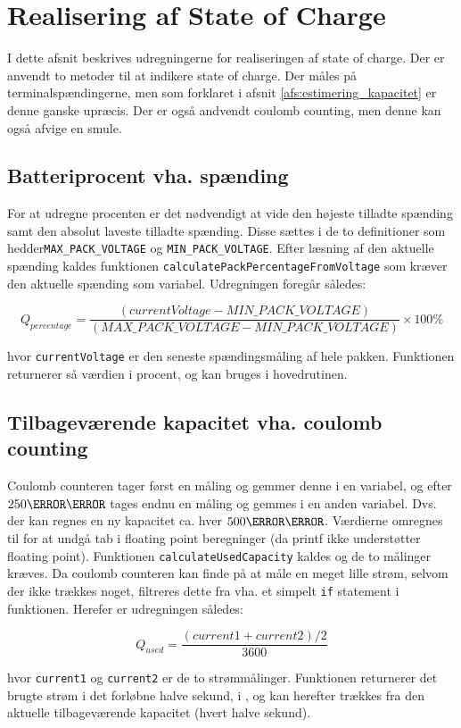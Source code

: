 \section{Realisering af State of Charge}\label{afs:SOC_realization}
I dette afsnit beskrives udregningerne for realiseringen af state of charge. Der er anvendt to metoder til at indikere state of charge. Der måles på terminalspændingerne, men som forklaret i afsnit \ref{afs:estimering_kapacitet} er denne ganske upræcis. Der er også andvendt coulomb counting, men denne kan også afvige en smule.

\subsection{Batteriprocent vha. spænding}
For at udregne procenten er det nødvendigt at vide den højeste tilladte spænding samt den absolut laveste tilladte spænding. Disse sættes i de to definitioner som hedder\newline \verb|MAX_PACK_VOLTAGE| og \verb|MIN_PACK_VOLTAGE|. Efter læsning af den aktuelle spænding kaldes funktionen \verb|calculatePackPercentageFromVoltage| som kræver den aktuelle spænding som variabel. Udregningen foregår således:

\begin {equation}
Q_{percentage} =  \frac{(\mathit{currentVoltage} - \mathit{MIN\_PACK\_VOLTAGE})}{(\mathit{MAX\_PACK\_VOLTAGE} - \mathit{MIN\_PACK\_VOLTAGE})} \times 100\percent
\label{eq:q_percentage}
\end {equation}

hvor \verb|currentVoltage| er den seneste spændingsmåling af hele pakken. Funktionen returnerer så værdien i procent, og kan bruges i hovedrutinen.

\subsection{Tilbageværende kapacitet vha. coulomb counting}
Coulomb counteren tager først en måling og gemmer denne i en variabel, og efter $250\milli\second$ tages endnu en måling og gemmes i en anden variabel. Dvs. der kan regnes en ny kapacitet ca. hver $500\milli\second$. Værdierne omregnes til \micro\ampere\space for at undgå tab i floating point beregninger (da printf ikke understøtter floating point). Funktionen \verb|calculateUsedCapacity| kaldes og de to målinger kræves. Da coulomb counteren kan finde på at måle en meget lille strøm, selvom der ikke trækkes noget, filtreres dette fra vha. et simpelt \verb|if| statement i funktionen. Herefer er udregningen således: 

\begin {equation}
Q_{used} =  \frac{(\mathit{current1} + \mathit{current2}) / 2}{3600}
\label{eq:q_used}
\end {equation}

hvor \verb|current1| og \verb|current2| er de to strømmålinger. Funktionen returnerer det brugte strøm i det forløbne halve sekund, i \micro\ampere, og kan herefter trækkes fra den aktuelle tilbageværende kapacitet (hvert halve sekund). 